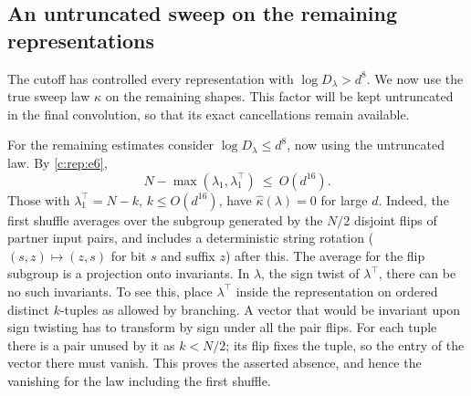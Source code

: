 \subsection{An untruncated sweep on the remaining representations}
The cutoff has controlled every representation with
$\log D_\lambda>d^8$. We now use the true sweep law $\kappa$ on the
remaining shapes. This factor will be kept untruncated in the final
convolution, so that its exact cancellations remain available.

For the remaining estimates consider \(\log D_\lambda\le d^8\), now using the untruncated law.
By \eqref{c:rep:e6},
\[
N-\max(\lambda_1,\lambda^\top_1)\ \le\ O(d^{16}).
\]
Those with \(\lambda^\top_1=N-k\), \(k\le O(d^{16})\), have \(\widehat\kappa(\lambda)=0\) for
large \(d\). Indeed, the first shuffle averages over the subgroup generated by the \(N/2\)
disjoint flips of partner input pairs, and includes a deterministic string rotation
(\((s,z)\mapsto(z,s)\) for bit \(s\) and suffix \(z\)) after this. The average for the flip
subgroup is a projection onto invariants. In \(\lambda\), the sign twist of \(\lambda^\top\),
there can be no such invariants. To see this, place \(\lambda^\top\) inside the representation
on ordered distinct \(k\)-tuples as allowed by branching. A vector that would be invariant upon
sign twisting has to transform by sign under all the pair flips. For each tuple there is a pair
unused by it as \(k<N/2\); its flip fixes the tuple, so the entry of the vector there must
vanish. This proves the asserted absence, and hence the vanishing for the law including the
first shuffle.

